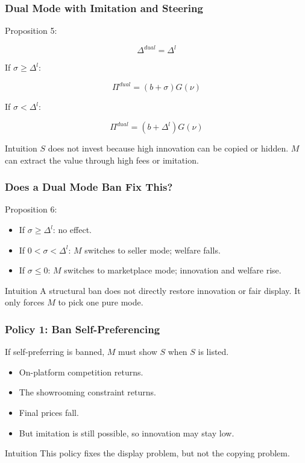 \documentclass[aspectratio=169,AutoFakeBold,AutoFakeSlant]{beamer}
\begin{document}
\begin{frame}
  \frametitle{Dual Mode with Imitation and Steering}
  \small
  Proposition 5:

  \begin{equation*}
    \Delta^{dual}=\Delta^l
  \end{equation*}

  If $\sigma\geq\Delta^l$:

  \begin{equation*}
    \Pi^{dual}=(b+\sigma)G(\nu)
  \end{equation*}

  If $\sigma<\Delta^l$:

  \begin{equation*}
    \Pi^{dual}=(b+\Delta^l)G(\nu)
  \end{equation*}

  \begin{block}{Intuition}
    $S$ does not invest because high innovation can be copied or hidden. $M$ can extract the value through high fees or imitation.
  \end{block}
\end{frame}

\begin{frame}
  \frametitle{Does a Dual Mode Ban Fix This?}
  \small
  Proposition 6:

  \begin{itemize}
    \item If $\sigma\geq\Delta^l$: no effect.
    \item If $0<\sigma<\Delta^l$: $M$ switches to seller mode; welfare falls.
    \item If $\sigma\leq0$: $M$ switches to marketplace mode; innovation and welfare rise.
  \end{itemize}

  \begin{alertblock}{Intuition}
    A structural ban does not directly restore innovation or fair display. It only forces $M$ to pick one pure mode.
  \end{alertblock}
\end{frame}

\begin{frame}
  \frametitle{Policy 1: Ban Self-Preferencing}
  \small
  If self-preferring is banned, $M$ must show $S$ when $S$ is listed.

  \begin{itemize}
    \item On-platform competition returns.
    \item The showrooming constraint returns.
    \item Final prices fall.
    \item But imitation is still possible, so innovation may stay low.
  \end{itemize}

  \begin{block}{Intuition}
    This policy fixes the display problem, but not the copying problem.
  \end{block}
\end{frame}
\end{document}
